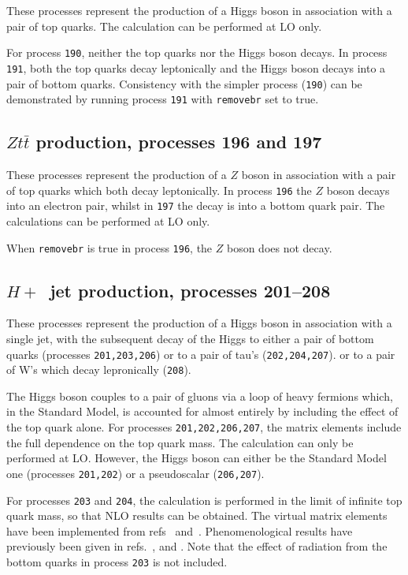\documentclass[12pt]{article}
\begin{document}
These processes represent the production of a Higgs boson in association
with a pair of top quarks. The calculation can be performed at LO only.

For process {\tt 190}, neither the top quarks nor the Higgs boson
decays. In process {\tt 191}, both the top quarks decay leptonically
and the Higgs boson decays into a pair of bottom quarks. 
Consistency with
the simpler process ({\tt 190}) can be demonstrated by running process
{\tt 191} with {\tt removebr} set to true.

\subsection{$Zt{\bar t}$ production, processes 196 and 197}
\label{subsec:ztt}

These processes represent the production of a $Z$ boson in association
with a pair of top quarks which both decay leptonically.
In process {\tt 196} the $Z$ boson decays into an electron pair, whilst
in {\tt 197} the decay is into a bottom quark pair.
The calculations can be performed at LO only.

When {\tt removebr} is true in process {\tt 196}, the $Z$ boson does not decay.

\subsection{$H+$~jet production, processes 201--208}
\label{subsec:hjet}

These processes represent the production of a Higgs boson in association
with a single jet, with the subsequent decay of the Higgs to either
a pair of bottom quarks (processes {\tt 201,203,206}) 
or to a pair of tau's ({\tt 202,204,207}).
or to a pair of W's which decay lepronically ({\tt 208}).

The Higgs boson couples to a pair of gluons via a loop of heavy fermions
which, in the Standard Model, is accounted for almost entirely by including
the effect of the top quark alone. For processes {\tt 201,202,206,207}, the
matrix elements include the full dependence on the top quark mass.
The calculation can only be performed at LO. 
However, the Higgs boson can either be the Standard Model one
(processes {\tt 201,202}) or a pseudoscalar ({\tt 206,207}).

For processes {\tt 203} and {\tt 204}, the calculation is performed in the
limit of infinite top quark mass, so that NLO results can be obtained.
The virtual matrix elements have been implemented from
refs~\cite{Ravindran:2002dc} and~\cite{Schmidt:1997wr}.
Phenomenological results have previously been 
given in refs.~\cite{deFlorian:1999zd},\cite{Ravindran:2002dc} 
and \cite{Glosser:2002gm}.
Note that the effect of radiation from the bottom quarks in process {\tt 203}
is not included.
\end{document}
